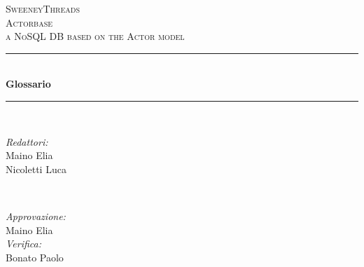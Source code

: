 \documentclass[a4paper]{article}
\begin{document}
	
	\begin{titlepage}
		\newcommand{\HRule}{\rule{\linewidth}{0.5mm}} 
		\center  
		
		\textsc{\LARGE SweeneyThreads}\\[1.5cm] 
		\textsc{\Large Actorbase}\\[0.5cm] 
		\textsc{\large a NoSQL DB based on the Actor model}\\[0.5cm]
		
		
		\HRule \\[0.4cm]
		{ \huge \bfseries Glossario}\\[0.4cm] 
		\HRule \\[1.5cm]
		
		\begin{minipage}{0.4\textwidth}
			\begin{flushleft} \large
				\emph{Redattori:}\\
				Maino Elia\\
				Nicoletti Luca
			\end{flushleft}
		\end{minipage}
		~
		\begin{minipage}{0.4\textwidth}
			\begin{flushright} \large
				\emph{Approvazione:} \\
				Maino Elia \\
				\emph{Verifica:} \\
				Bonato Paolo \\
			\end{flushright}
		\end{minipage}
		

\end{titlepage}
\end{document}
